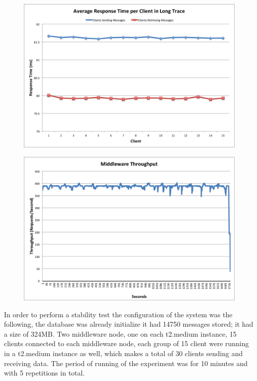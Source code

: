 \begin{figure}[h!]
	\centering
	\includegraphics[scale=0.35]{stabilityRP.png}
	\caption{}
	\label{stabilityRP}
\end{figure}
\begin{figure}[h!]
	\centering
	\includegraphics[scale=0.35]{stabilityTHR.png}
	\caption{}
	\label{stabilityTHR}
\end{figure}
In order to perform a stability test the configuration of the system was the following, the database was already initialize it had 14750 messages stored; it had a size of 324MB. Two middleware node, one on each t2.medium instance, 15 clients connected to each middleware node, each group of 15 client were running in a t2.medium instance as well, which makes a total of 30 clients sending and receiving data. The period of running of the experiment was for 10 minutes and with 5 repetitions in total.\\

